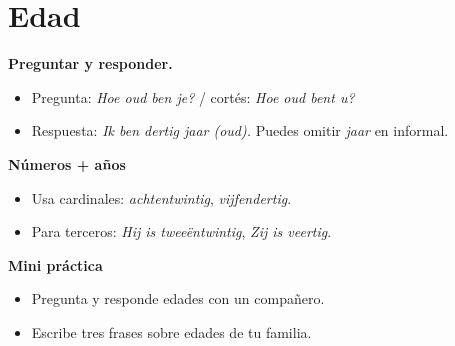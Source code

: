 \section{Edad}
\textbf{Preguntar y responder.}
\begin{itemize}[leftmargin=*]
  \item Pregunta: \textit{Hoe oud ben je?} / cortés: \textit{Hoe oud bent u?}
  \item Respuesta: \textit{Ik ben dertig jaar (oud).} Puedes omitir \textit{jaar} en informal.
\end{itemize}

\textbf{Números + años}
\begin{itemize}[leftmargin=*]
  \item Usa cardinales: \textit{achtentwintig}, \textit{vijfendertig}.
  \item Para terceros: \textit{Hij is tweeëntwintig}, \textit{Zij is veertig}.
\end{itemize}

\textbf{Mini práctica}
\begin{itemize}[leftmargin=*]
  \item Pregunta y responde edades con un compañero.
  \item Escribe tres frases sobre edades de tu familia.
\end{itemize}
